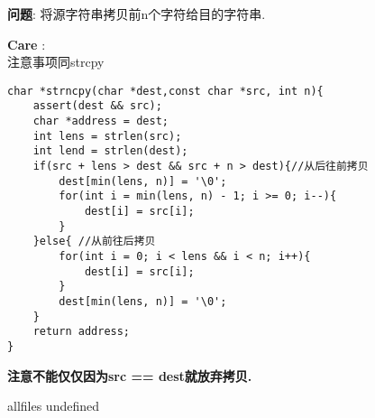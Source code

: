 \documentclass{article}
\begin{document}
\begin{CJK}{UTF8}{gbsn}     %

\else
    
\begin{description}
    \item{\textbf{问题}}: 将源字符串拷贝前n个字符给目的字符串.
    \item{\textbf{Care}} : 
	\\注意事项同strcpy
    \begin{lstlisting}
char *strncpy(char *dest,const char *src, int n){
	assert(dest && src);
	char *address = dest;
	int lens = strlen(src);
	int lend = strlen(dest);
	if(src + lens > dest && src + n > dest){//从后往前拷贝
		dest[min(lens, n)] = '\0';
		for(int i = min(lens, n) - 1; i >= 0; i--){
			dest[i] = src[i];
		}
	}else{ //从前往后拷贝
		for(int i = 0; i < lens && i < n; i++){
			dest[i] = src[i];
		}
		dest[min(lens, n)] = '\0';
	}
	return address;
}
    \end{lstlisting}
	\textbf{注意不能仅仅因为src == dest就放弃拷贝.}
\end{description}

\fi

\ifx allfiles undefined
\end{CJK}
\end{document}
